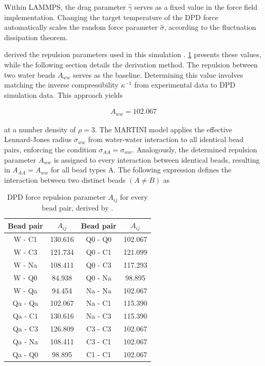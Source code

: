 \documentclass[
    11pt,
    a4paper,
    oneside,        %
    BCOR=10mm,      %
    parskip=half,   %
    listof=nototoc,   %
    bibliography=totoc %
]{scrreprt}
\begin{document}
Within LAMMPS, the drag parameter $\hat{\gamma}$ serves as a fixed value in the force field implementation. Changing the target temperature of the DPD force automatically scales the random force parameter $\hat{\sigma}$, according to the fluctuation dissipation theorem.

\citeauthor{Wang2024} derived the repulsion parameters used in this simulation \cite{Wang2024}. \cref{tab:dpd_params} presents these values, while the following section details the derivation method. The repulsion between two water beads $A_{ww}$ serves as the baseline. Determining this value involves matching the inverse compressibility $\kappa^{-1}$ from experimental data to DPD simulation data. This approach yields 

\begin{align}
    A_{ww} = 102.067
\end{align}


at a number density of $\rho = 3$. The MARTINI model applies the effective Lennard-Jones radius $\sigma_{ww}$ from water-water interaction to all identical bead pairs, enforcing the condition $\sigma_{AA} = \sigma_{ww}$. Analogously, the determined repulsion parameter $A_{ww}$ is assigned to every interaction between identical beads, resulting in $A_{AA} = A_{ww}$ for all bead types A. The following expression defines the interaction between two distinct beads $(A \neq B)$ as


\begin{table}[t]
\centering
\begin{tabular}{cccc}
\toprule
Bead pair & $A_{ij}$ & Bead pair & $A_{ij}$\\
\midrule
W - C1     & 130.616 & Q0 - Q0    & 102.067 \\ 
W - C3     & 121.734 & Q0 - C1    & 121.099 \\ 
W - Na     & 108.411 & Q0 - C3    & 117.293 \\ 
W - Q0     & 84.938  & Q0 - Na    & 98.895  \\ 
W - Qa     & 94.454  & Na - Na    & 102.067 \\ 
Qa - Qa    & 102.067 & Na - C1    & 115.390 \\ 
Qa - C1    & 130.616 & Na - C3    & 115.390 \\ 
Qa - C3    & 126.809 & C3 - C3    & 102.067 \\ 
Qa - Na    & 108.411 & C3 - C1    & 102.067 \\ 
Qa - Q0    & 98.895  & C1 - C1    & 102.067 \\ 

\bottomrule
\end{tabular}
\caption{DPD force repulsion parameter $A_{ij}$ for every bead pair, derived by \citeauthor{Wang2024} \cite{Wang2024}.}
\label{tab:dpd_params}
\end{table}
\end{document}

